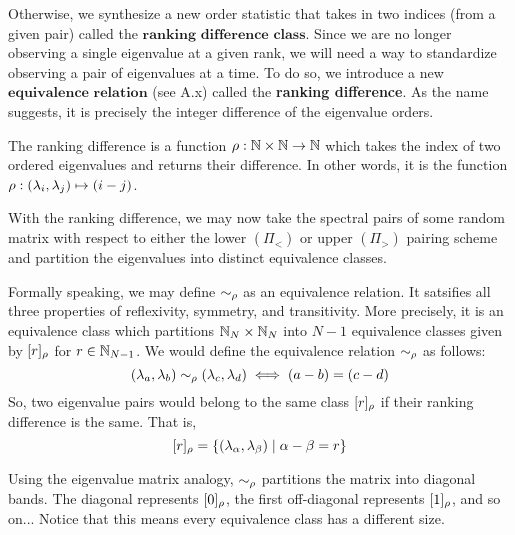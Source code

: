 Otherwise, we synthesize a new order statistic that takes in two indices (from a given pair) called the $\textbf{ranking difference class}$.
Since we are no longer observing a single eigenvalue at a given rank, we will need a way to standardize observing a pair of eigenvalues at a time.
To do so, we introduce a new $\textbf{equivalence relation}$ (see A.x) called the \textbf{ranking difference}. As the name suggests, it is precisely the integer difference of the eigenvalue orders.


\begin{definition}
The ranking difference is a function ${\rho}: \mathbb{N} \times \mathbb{N} \to \mathbb{N}$ which takes the index of two ordered eigenvalues and returns their difference.
In other words, it is the function ${\rho}: (\lambda_i,\lambda_j) \mapsto (i - j)$.
\end{definition}

With the ranking difference, we may now take the spectral pairs of some random matrix with respect to either the lower $(\Pi_<)$ or upper $(\Pi_>)$ pairing scheme
and partition the eigenvalues into distinct equivalence classes.

\begin{remark}
Formally speaking, we may define $\sim_{\rho}$ as an equivalence relation. It satsifies all three properties of reflexivity, symmetry, and transitivity.
More precisely, it is an equivalence class which partitions $\mathbb{N}_N \times \mathbb{N}_N$ into $N - 1$ equivalence classes given by $[r]_{\rho}$ for $r \in \mathbb{N}_{N-1}$.
We would define the equivalence relation $\sim_{\rho}$ as follows:
$$(\lambda_a,\lambda_b) \sim_{\rho} (\lambda_c,\lambda_d) \iff (a -b) = (c-d)$$
So, two eigenvalue pairs would belong to the same class $[r]_{\rho}$ if their ranking difference is the same. That is,
$$[r]_{\rho} = \{(\lambda_\alpha, \lambda_\beta) \mid \alpha - \beta = r\}$$
\end{remark}

\begin{remark}
Using the eigenvalue matrix analogy, $\sim_{\rho}$ partitions the matrix into diagonal bands.
The diagonal represents $[0]_{\rho}$, the first off-diagonal represents $[1]_{\rho}$, and so on...
Notice that this means every equivalence class has a different size.
\end{remark}


